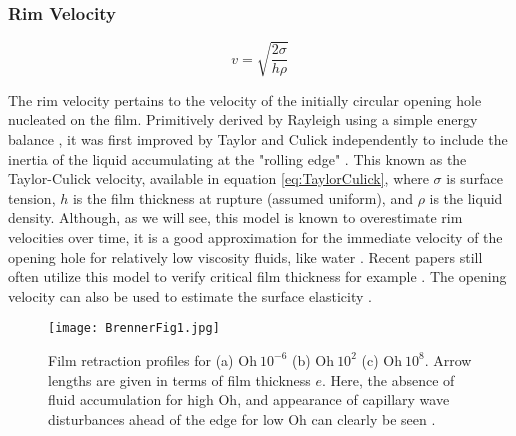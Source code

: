 \documentclass[a4paper,12pt]{article}
\numberwithin{equation}{section}
\numberwithin{figure}{section}
\numberwithin{table}{section}
\begin{document}
\subsubsection{Rim Velocity}

\begin{equation}
    \label{eq:TaylorCulick}
    v = \sqrt{\frac{2 \sigma}{h \rho}}
\end{equation}

The rim velocity pertains to the velocity of the initially circular opening hole nucleated on the film. Primitively derived by Rayleigh using a simple energy balance \cite{Rayleigh1902}, it was first improved by Taylor and Culick independently to include the inertia of the liquid accumulating at the "rolling edge" \cite{Taylor1959, Culick1960}. This known as the Taylor-Culick velocity, available in equation \ref{eq:TaylorCulick}, where $\sigma$ is surface tension, $h$ is the film thickness at rupture (assumed uniform), and $\rho$ is the liquid density. Although, as we will see, this model is known to overestimate rim velocities over time, it is a good approximation for the immediate velocity of the opening hole for relatively low viscosity fluids, like water \cite{Brenner1999, Lhuissier2011}. Recent papers still often utilize this model to verify critical film thickness for example \cite{Modini2013, Debregeas1998}. The opening velocity can also be used to estimate the surface elasticity \cite{Petit2015}.

\begin{figure}[!htbp]
    \centering
    \captionsetup{width=.9\linewidth}
    \texttt{[image: BrennerFig1.jpg]}
    \caption{Film retraction profiles for (a) $\mathrm{Oh} ~ 10^{-6}$ (b) $\mathrm{Oh}~ 10^{2}$ (c) $\mathrm{Oh}~ 10^{8}$. Arrow lengths are given in terms of film thickness $e$. Here, the absence of fluid accumulation for high $\mathrm{Oh}$, and appearance of capillary wave disturbances ahead of the edge for low $\mathrm{Oh}$ can clearly be seen \cite{Brenner1999}.}
    \label{fig:Brenner1}
\end{figure}
\end{document}
